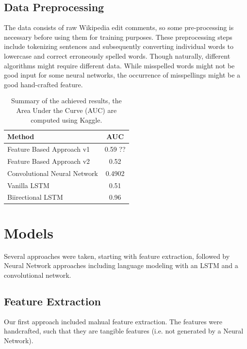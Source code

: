\documentclass[10pt, a4paper]{article}
\begin{document}
	\begin{multicols}{2}
		
		
		\subsection*{Data Preprocessing}
		The data consists of raw Wikipedia edit comments, so some pre-processing is necessary before using them for training purposes. These preprocessing steps include tokenizing sentences and subsequently converting individual words to lowercase and correct erroneously spelled words. Though  naturally, different algorithms might require different data. While misspelled words might not be good input for some neural networks, the occurrence of misspellings might be a good hand-crafted feature.
		
		\begin{table}[t]
			\centering
			\begin{tabular}{l|c}
				\toprule
				\textbf{Method} & \textbf{AUC} \\
				\midrule
				Feature Based Approach v1 & 0.59 ??  \\
				Feature Based Approach v2 & 0.52 \\
				Convolutional Neural Network & 0.4902 \\
				Vanilla LSTM & 0.51 \\
				Biirectional LSTM & 0.96 \\
				\bottomrule
			\end{tabular}
			\caption{Summary of the achieved results, the Area Under the Curve (AUC) are computed using Kaggle.}
			\label{table:summary_results}
		\end{table}
		
		
		\section{Models}
		Several approaches were taken, starting with feature extraction, followed by Neural Network approaches including language modeling with an LSTM and a convolutional network.
		
		\subsection{Feature Extraction}
		Our first approach included mahual feature extraction. The features were handcrafted, such that they are tangible features (i.e. not generated by a Neural Network).

\end{multicols}
\end{document}
